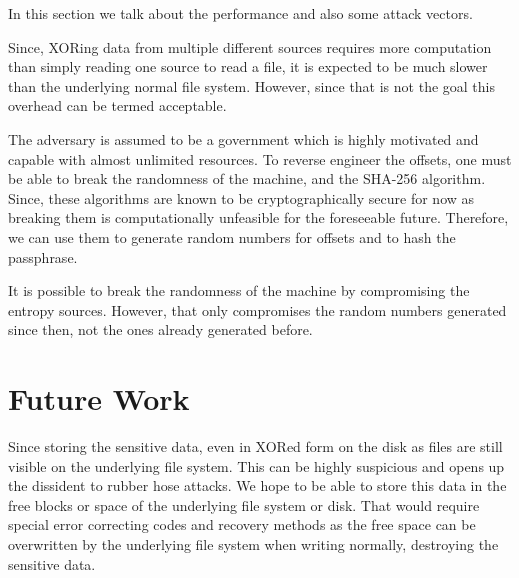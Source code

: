 \documentclass[10pt,onecolumn]{article}
\begin{document}
In this section we talk about the performance and also some attack vectors. 

Since, XORing data from multiple different sources requires more computation than simply reading one source to read a file, it is expected to be much slower than the underlying normal file system. However, since that is not the goal this overhead can be termed acceptable. 

The adversary is assumed to be a government which is highly motivated and capable with almost unlimited resources. To reverse engineer the offsets, one must be able to break the randomness of the machine, and the SHA-256 algorithm. Since, these algorithms are known to be cryptographically secure for now as breaking them is computationally unfeasible for the foreseeable future. Therefore, we can use them to generate random numbers for offsets and to hash the passphrase. 

It is possible to break the randomness of the machine by compromising the entropy sources. However, that only compromises the random numbers generated since then, not the ones already generated before. 

\section{Future Work}

Since storing the sensitive data, even in XORed form on the disk as files are still visible on the underlying file system. This can be highly suspicious and opens up the dissident to rubber hose attacks. We hope to be able to store this data in the free blocks or space of the underlying file system or disk. That would require special error correcting codes and recovery methods as the free space can be overwritten by the underlying file system when writing normally, destroying the sensitive data. 



\end{document}
